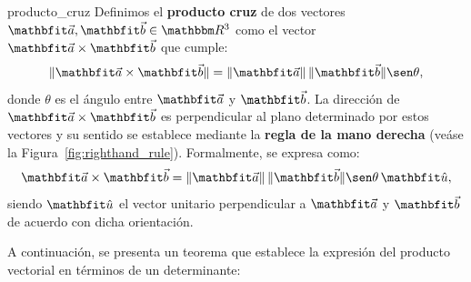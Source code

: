 \begin{definition}{}{producto_cruz}
    Definimos el \textbf{producto cruz} de dos vectores $\veca, \vecb \in \RR[3]$ como el vector $\veca \times \vecb$ que cumple:
    $$\|\veca \times \vecb\| = \|\veca\|\,\|\vecb\| \sen \theta,$$
    donde $\theta$ es el ángulo entre $\veca$ y $\vecb$. La dirección de $\veca \times \vecb$ es perpendicular al plano determinado por estos vectores y su sentido se establece mediante la \textbf{regla de la mano derecha} (veáse la Figura~\ref{fig:righthand_rule}). Formalmente, se expresa como:
    $$\veca \times \vecb = \|\veca\|\,\|\vecb\| \sen \theta \,\uniu,$$
    siendo $\uniu$ el vector unitario perpendicular a $\veca$ y $\vecb$ de acuerdo con dicha orientación.
\end{definition}

A continuación, se presenta un teorema que establece la expresión del producto vectorial en términos de un determinante:

